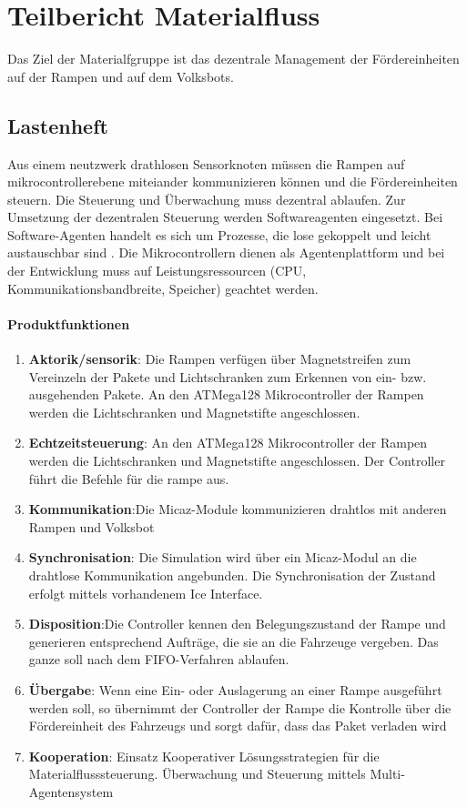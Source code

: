 \section{Teilbericht Materialfluss}
Das Ziel der Materialfgruppe ist das dezentrale Management der Fördereinheiten auf der Rampen und auf dem Volksbots.
\subsection{Lastenheft}
Aus einem neutzwerk drathlosen Sensorknoten müssen die Rampen auf mikrocontrollerebene miteiander kommunizieren können und die Fördereinheiten steuern.
Die Steuerung und Überwachung muss dezentral ablaufen. Zur Umsetzung der dezentralen Steuerung werden Softwareagenten eingesetzt. Bei
Software-Agenten handelt es sich um Prozesse, die lose gekoppelt und leicht austauschbar sind \cite[vgl.][S. 31-37]{GH10}.
Die Mikrocontrollern dienen als Agentenplattform und bei der Entwicklung muss auf Leistungsressourcen (CPU, Kommunikationsbandbreite, Speicher) geachtet werden.
\paragraph{Produktfunktionen}
\begin{enumerate}
 \item \textbf{Aktorik/sensorik}: Die Rampen verfügen über Magnetstreifen zum Vereinzeln der Pakete und Lichtschranken 
 zum Erkennen von ein- bzw. ausgehenden Pakete. An den ATMega128 Mikrocontroller der Rampen werden die Lichtschranken und Magnetstifte angeschlossen.
 \item \textbf{Echtzeitsteuerung}: An den ATMega128 Mikrocontroller der Rampen werden die Lichtschranken und Magnetstifte angeschlossen. Der Controller führt die
 Befehle für die rampe aus. 
 \item \textbf{Kommunikation}:Die Micaz-Module kommunizieren drahtlos mit anderen Rampen und Volksbot
 \item \textbf{Synchronisation}: Die Simulation wird über ein Micaz-Modul an die drahtlose Kommunikation angebunden. Die Synchronisation der Zustand erfolgt
  mittels vorhandenem Ice Interface.
 \item \textbf{Disposition}:Die Controller kennen den Belegungszustand der Rampe und generieren entsprechend Aufträge, die sie an die Fahrzeuge vergeben. 
 Das ganze soll nach dem FIFO-Verfahren ablaufen.
 \item \textbf{Übergabe}: Wenn eine Ein- oder Auslagerung an einer Rampe ausgeführt werden soll, so übernimmt der Controller der Rampe die Kontrolle
 über die Fördereinheit des Fahrzeugs und sorgt dafür, dass das Paket verladen wird
 \item \textbf{Kooperation}: Einsatz Kooperativer Lösungsstrategien für die Materialflusssteuerung. Überwachung und Steuerung mittels Multi-Agentensystem
\end{enumerate}

